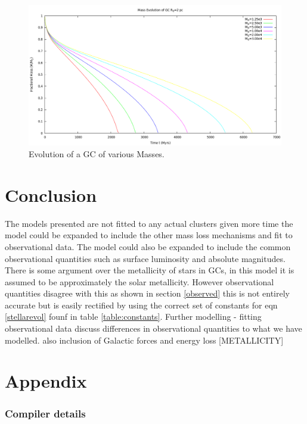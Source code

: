 \documentclass[%
 aip,
 jmp,%
 amsmath,amssymb,
 reprint,%
]{revtex4-1}
\begin{document}
\begin{figure}[t]
\centering
\includegraphics[width=1\textwidth]{fig1.png}
\caption{Evolution of a GC of various Masses.}
\label{varmassconstradii}
\end{figure}


\section{\label{sec:level1}Conclusion}
The models presented are not fitted to any actual clusters given more time the model could be expanded to include the other mass loss mechanisms and fit to observational data. The model could also be expanded to include the common observational quantities such as surface luminosity and absolute magnitudes. There is some argument over the metallicity of stars in GCs, in this model it is assumed to be approximately the solar metallicity. However observational quantities disagree with this as shown in section \ref{observed} this is not entirely accurate but is easily rectified by using the correct set of constants for eqn \eqref{stellarevol} founf in table \ref{table:constants}.
Further modelling - fitting observational data discuss differences in observational quantities to what we have modelled. also inclusion of Galactic forces and energy loss
[METALLICITY]

\clearpage


\section{Appendix}\label{appendix}
\subsubsection{Compiler details}\label{compiler}
\end{document}
